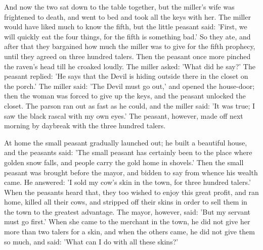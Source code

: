 \documentclass[12pt]{book}
\begin{document}
And now the two sat down to the table together, but the miller's wife
was frightened to death, and went to bed and took all the keys with
her. The miller would have liked much to know the fifth, but the
little peasant said: 'First, we will quickly eat the four things, for
the fifth is something bad.' So they ate, and after that they
bargained how much the miller was to give for the fifth prophecy,
until they agreed on three hundred talers. Then the peasant once more
pinched the raven's head till he croaked loudly. The miller asked:
'What did he say?' The peasant replied: 'He says that the Devil is
hiding outside there in the closet on the porch.' The miller said:
'The Devil must go out,' and opened the house-door; then the woman was
forced to give up the keys, and the peasant unlocked the closet. The
parson ran out as fast as he could, and the miller said: 'It was true;
I saw the black rascal with my own eyes.' The peasant, however, made
off next morning by daybreak with the three hundred talers.

At home the small peasant gradually launched out; he built a beautiful
house, and the peasants said: 'The small peasant has certainly been to
the place where golden snow falls, and people carry the gold home in
shovels.' Then the small peasant was brought before the mayor, and
bidden to say from whence his wealth came. He answered: 'I sold my
cow's skin in the town, for three hundred talers.' When the peasants
heard that, they too wished to enjoy this great profit, and ran home,
killed all their cows, and stripped off their skins in order to sell
them in the town to the greatest advantage. The mayor, however, said:
'But my servant must go first.' When she came to the merchant in the
town, he did not give her more than two talers for a skin, and when
the others came, he did not give them so much, and said: 'What can I
do with all these skins?'
\end{document}
